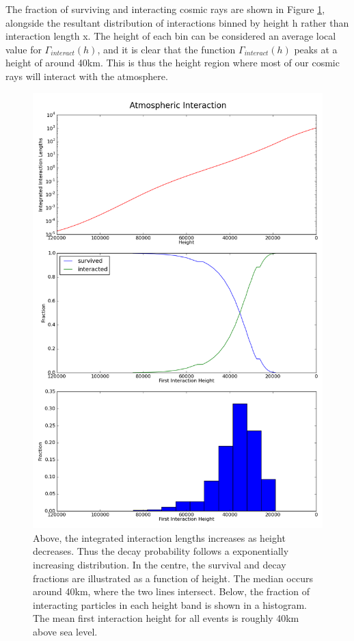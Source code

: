 \documentclass[11pt]{article}
\begin{document}
The fraction of surviving and interacting cosmic rays are shown in Figure \ref{fig:generalheight}, alongside the resultant distribution of interactions binned by height h rather than interaction length x. The height of each bin can be considered an average local value for $\Gamma_{interact}(h)$, and it is clear that the function $\Gamma_{interact}(h)$ peaks at a height of around 40km. This is thus the height region where most of our cosmic rays will interact with the atmosphere.

\begin{figure}
\begin{center}
\includegraphics[height=0.9\textheight]{generalheight}
\caption{Above, the integrated interaction lengths increases as height decreases. Thus the decay probability follows a exponentially increasing distribution. In the centre, the survival and decay fractions are illustrated as a function of height. The median occurs around 40km, where the two lines intersect. Below, the fraction of interacting particles in each height band is shown in a histogram. The mean first interaction height for all events is roughly 40km above sea level.}
\label{fig:generalheight}
\end{center}
\end{figure}
\end{document}
